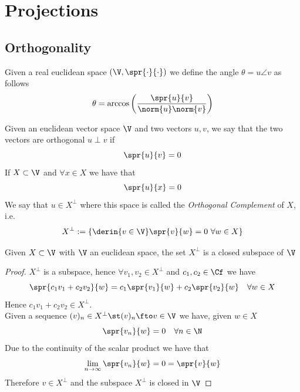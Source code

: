 \documentclass[../mmf.tex]{subfiles}
\begin{document}
\section{Projections}
\subsection{Orthogonality}
\begin{dfn}[Angle]
	Given a real euclidean space $(\V,\spr{\cdot}{\cdot})$ we define the angle $\theta=u\angle v$ as follows
	\begin{equation}
		\theta=\arccos\left( \frac{\spr{u}{v}}{\norm{u}\norm{v}} \right)
		\label{eq:anglebwvec}
	\end{equation}
\end{dfn}
\begin{dfn}
	Given an euclidean vector space $\V$ and two vectors $u,v$, we say that the two vectors are orthogonal $u\perp v$ if
	\begin{equation}
		\spr{u}{v}=0
		\label{eq:orthvec}
	\end{equation}
	If $X\subset\V$ and $\forall x\in X$ we have that
	\begin{equation*}
		\spr{u}{x}=0
	\end{equation*}
	We say that $u\in X^{\perp}$ where this space is called the \textit{Orthogonal Complement} of $X$, i.e.
	\begin{equation}
		X^\perp:=\left\{ \derin{v\in\V}\spr{v}{w}=0\ \forall w\in X \right\}
		\label{eq:xbot}
	\end{equation}
\end{dfn}
\begin{thm}
	Given $X\subset\V$ with $\V$ an euclidean space, the set $X^\perp$ is a closed subspace of $\V$
\end{thm}
\begin{proof}
	$X^\perp$ is a subspace, hence $\forall v_1,v_2\in X^\perp$ and $c_1,c_2\in\Cf$ we have
	\begin{equation*}
		\spr{c_1v_1+c_2v_2}{w}=c_1\spr{v_1}{w}+c_2\spr{v_2}{w}\quad\forall w\in X
	\end{equation*}
	Hence $c_1v_1+c_2v_2\in X^\perp$.\\
	Given a sequence $(v)_n\in X^{\perp}\st(v)_n\fto v\in\V$ we have, given $w\in X$
	\begin{equation*}
		\spr{v_n}{w}=0\quad\forall n\in\N
	\end{equation*}
	Due to the continuity of the scalar product we have that
	\begin{equation*}
		\lim_{n\to\infty}\spr{v_n}{w}=0=\spr{v}{w}
	\end{equation*}
	Therefore $v\in X^\perp$ and the subspace $X^\perp$ is closed in $\V$
\end{proof}
\end{document}
